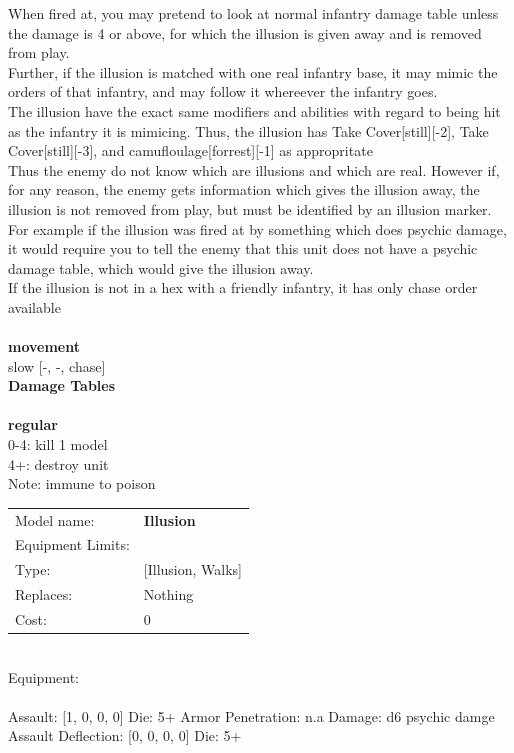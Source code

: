 \noindent When fired at, you may pretend to look at normal infantry damage table unless the damage is 4 or above, for which the illusion is given away and is removed from play.\\ 
Further, if the illusion is matched with one real infantry base, it may mimic the orders of that infantry, and may follow it whereever the infantry goes.\\ 
The illusion have the exact same modifiers and abilities with regard to being hit as the infantry it is mimicing. Thus, the illusion has Take Cover[still][-2], Take Cover[still][-3], and camufloulage[forrest][-1] as appropritate \\ 
 Thus the enemy do not know which are illusions and which are real. However if, for any reason, the enemy gets information which gives the illusion away, the illusion is not removed from play, but must be identified by an illusion marker. For example if the illusion was fired at by something which does psychic damage, it would require you to tell the enemy that this unit does not have a psychic damage table, which would give the illusion away.\\ 
If the illusion is not in a hex with a friendly infantry, it has only chase order available\\ 


\ \\ {\bf movement } \\
slow [-, -, chase] \\


{\bf Damage Tables} \\
\ \\ {\bf regular } \\
0-4: kill 1 model \\
4+: destroy unit \\
Note: immune to poison \\


\noindent
\begin{tabular}{ll}
Model name: &{\bf Illusion } \\
Equipment Limits: & \\
Type: &[Illusion, Walks] \\
Replaces: &Nothing \\
Cost: & 0\\
\end{tabular}
\ \\
Equipment:  \\
\ \\
Assault: [1, 0, 0, 0] Die: 5+ Armor Penetration: n.a Damage: d6 psychic damge \\
Assault Deflection: [0, 0, 0, 0] Die: 5+\\
\indent  
\ \\


